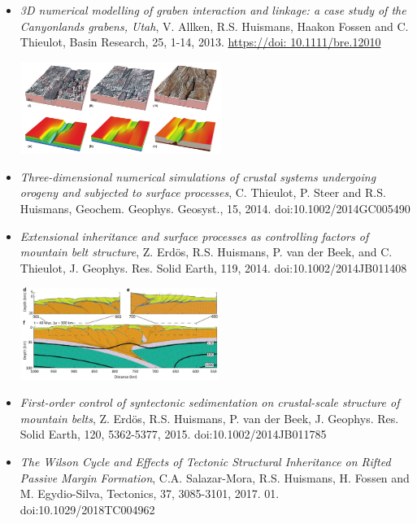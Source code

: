 \begin{itemize}
\item {\it 3D numerical modelling of graben interaction and linkage: a case study of the Canyonlands grabens, Utah}, 
V. Allken, R.S. Huismans, Haakon Fossen and C. Thieulot, Basin Research, 25, 1-14, 2013.
\url{https://doi: 10.1111/bre.12010}

\begin{center}
\includegraphics[height=3cm]{images/mycodes/alhf13_img}
\end{center}


\item {\it Three-dimensional numerical simulations of crustal systems undergoing orogeny and subjected to surface processes}, 
C. Thieulot, P. Steer and R.S. Huismans, Geochem. Geophys. Geosyst., 15, 2014. doi:10.1002/2014GC005490

\item {\it Extensional inheritance and surface processes as controlling factors of mountain belt structure}, 
Z. Erd\"os, R.S. Huismans, P. van der Beek, and C. Thieulot, J. Geophys. Res. Solid Earth, 119, 2014. doi:10.1002/2014JB011408

\begin{center}
\includegraphics[height=3cm]{images/mycodes/erhv14_img}
\end{center}


\item {\it First-order control of syntectonic sedimentation on crustal-scale structure of mountain belts}, 
Z. Erd\"os, R.S. Huismans, P. van der Beek, J. Geophys. Res. Solid Earth, 120, 5362-5377, 2015. doi:10.1002/2014JB011785

\item {\it The Wilson Cycle and Effects of Tectonic Structural Inheritance
on Rifted Passive Margin Formation}, C.A. Salazar-Mora, R.S. Huismans, H. Fossen and M. Egydio-Silva, 
Tectonics, 37, 3085-3101, 2017. 01. doi:10.1029/2018TC004962 


\end{itemize}
